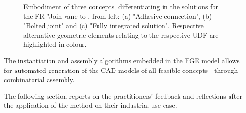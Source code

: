 \documentclass[aerospace,article,submit,moreauthors,pdftex]{Definitions/mdpi}
\newcommand{\Jakob}[1]{{{\color{orange}{\itshape{#1}}\color{black}}
    }{\ignorespaces}}
\newcommand{\revision}[1]{\color{black}{#1 }\color{black}}
\begin{document}
\begin{figure}[th!]
\begin{center}
\begin{subfigure}[b]{0.3\textwidth}
            \caption{}
            \label{fig:footOnepice}
        \end{subfigure}
        \caption{Embodiment of three concepts, differentiating in the solutions for the FR "Join vane to \revision{attachment"}, from left: (a) "Adhesive connection", (b) "Bolted joint" and (c) "Fully integrated solution".
        Respective alternative geometric elements relating to the respective UDF are highlighted in colour.}
        
        \label{fig:altGV}
    \end{center}
\end{figure}

The instantiation and assembly algorithms embedded in the FGE model allows for automated generation of the CAD models of all feasible concepts - through combinatorial assembly.  

The following section reports on the practitioners' feedback and reflections after the application of the method on their industrial use case. 







\end{document}
